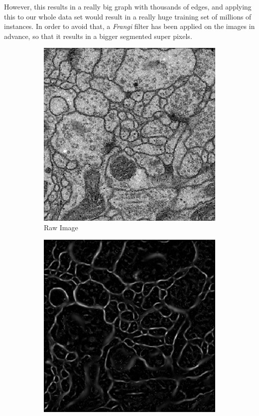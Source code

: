 \documentclass[12pt, a4paper]{scrartcl}
\begin{document}
However, this results in a really big graph with thousands of edges, and applying this to our whole data set would result in a really huge training set of millions of instances. In order to avoid that, a \emph{Frangi} filter \citep{scikit} has been applied on the images in advance, so that it results in a bigger segmented super pixels.

\begin{figure}[H]
\centering
\begin{subfigure}{.3\textwidth}
  \centering
  \includegraphics[width=.9\linewidth]{frangi1}
  \caption{Raw Image}
  \label{fig:frangi1}
\end{subfigure}%
\begin{subfigure}{.3\textwidth}
  \centering
  \includegraphics[width=.9\linewidth]{frangi2}

\end{subfigure}
\end{figure}
\end{document}

